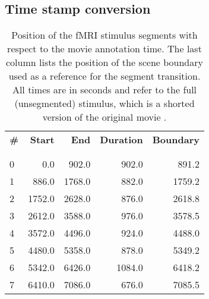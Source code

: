 \subsection*{Time stamp conversion}

\begin{table}
  \centering
  \begin{tabular}{lrrrr}
    \textbf{\#}  & \textbf{Start}  & \textbf{End}    & \textbf{Duration}& \textbf{Boundary} \\
  \\\hline\\
   0  & 0.0    & 902.0  & 902.0  & 891.2    \\
   1  & 886.0  & 1768.0 & 882.0  & 1759.2   \\
   2  & 1752.0 & 2628.0 & 876.0  & 2618.8   \\
   3  & 2612.0 & 3588.0 & 976.0  & 3578.5   \\
   4  & 3572.0 & 4496.0 & 924.0  & 4488.0   \\
   5  & 4480.0 & 5358.0 & 878.0  & 5349.2   \\
   6  & 5342.0 & 6426.0 & 1084.0 & 6418.2   \\
   7  & 6410.0 & 7086.0 & 676.0  & 7085.5   \\
  \end{tabular}

  \caption{Position of the fMRI stimulus segments with respect to the movie
    annotation time. The last column lists the position of the scene boundary
    used as a reference for the segment transition. All times are in seconds
    and refer to the full (unsegmented) stimulus, which is a shorted version of
    the original movie \cite{HBI+14}.}

  \label{tab:timing}
\end{table}




